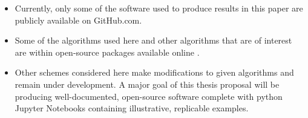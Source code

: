 \documentclass[11pt]{beamer}
\begin{document}
\begin{frame}

\begin{itemize}

	\item Currently, only some of the software used to produce results in this paper are publicly available on GitHub.com. 
	
	\item Some of the algorithms used here and other algorithms that are of interest are within open-source packages available online \footnotemark[1] \footnotemark[2]. 
	
	\item Other schemes considered here make modifications to given algorithms and remain under development. A major goal of this thesis proposal will be producing well-documented, open-source software complete with python Jupyter Notebooks containing illustrative, replicable examples.


\end{itemize}


\end{frame}



\end{document}
